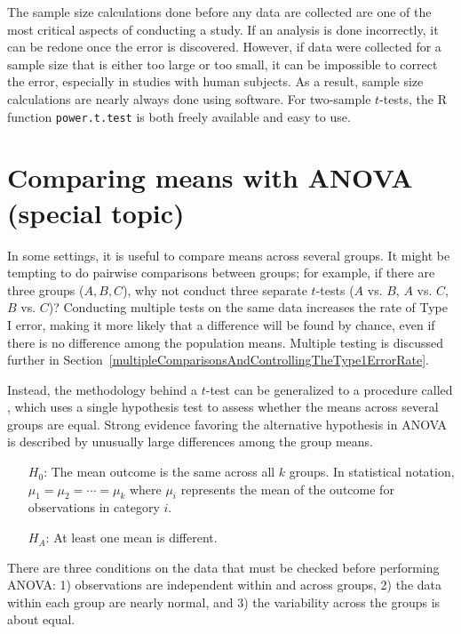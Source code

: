 The sample size calculations done before any data are collected are one of the most critical aspects of conducting a study. If an analysis is done incorrectly, it can be redone once the error is discovered. However, if data were collected for a sample size that is either too large or too small, it can be impossible to correct the error, especially in studies with human subjects. As a result, sample size calculations are nearly always done using software. For two-sample $t$-tests, the \textsf{R} function \texttt{power.t.test} is both freely available and easy to use.

\section[Comparing means with ANOVA (special topic)]{Comparing means with ANOVA (special topic)}
\label{anovaAndRegrWithCategoricalVariables}


In some settings, it is useful to compare means across several groups. It might be tempting to do pairwise comparisons between groups; for example, if there are three groups ($A, B, C$), why not conduct three separate $t$-tests ($A$ vs. $B$, $A$ vs. $C$, $B$ vs. $C$)? Conducting multiple tests on the same data increases the rate of Type I error, making it more likely that a difference will be found by chance, even if there is no difference among the population means. Multiple testing is discussed further in Section~\ref{multipleComparisonsAndControllingTheType1ErrorRate}.

Instead, the methodology behind a $t$-test can be generalized to a procedure called , which uses a single hypothesis test to assess whether the means across several groups are equal. Strong evidence favoring the alternative hypothesis in ANOVA is described by unusually large differences among the group means.

\begin{itemize}
	\setlength{\itemsep}{0mm}
	\item[$H_0$:] The mean outcome is the same across all $k$ groups. In statistical notation, $\mu_1 = \mu_2 = \cdots = \mu_k$ where $\mu_i$ represents the mean of the outcome for observations in category $i$.
	\item[$H_A$:] At least one mean is different.
\end{itemize}

There are three conditions on the data that must be checked before performing ANOVA: 1) observations are independent within and across groups, 2) the data within each group are nearly normal, and 3) the variability across the groups is about equal.

